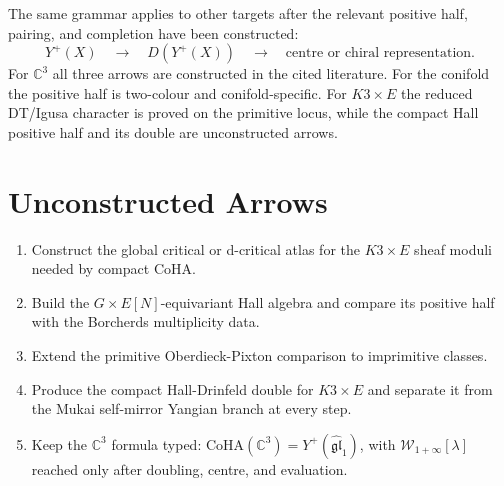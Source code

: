 \documentclass[11pt]{article}
\theoremstyle{definition}
\theoremstyle{remark}
\providecommand{\CoHA}{\mathrm{CoHA}}
\providecommand{\Winf}{\mathcal{W}_{1+\infty}}
\providecommand{\CC}{\mathbb{C}}
\providecommand{\gghone}{\widehat{\mathfrak{gl}}_1}
\begin{document}
The same grammar applies to other targets after the relevant positive
half, pairing, and completion have been constructed:
\[
 Y^+(X)\quad\longrightarrow\quad D(Y^+(X))\quad\longrightarrow\quad
\text{centre or chiral representation}.
\]
For $\CC^3$ all three arrows are constructed in the cited literature.
For the conifold the positive half is two-colour and conifold-specific.
For $K3\times E$ the reduced DT/Igusa character is proved on the
primitive locus, while the compact Hall positive half and its double are
unconstructed arrows.

\section{Unconstructed Arrows}
\label{sec:unconstructed-arrows}

\begin{enumerate}
\item Construct the global critical or d-critical atlas for the
$K3\times E$ sheaf moduli needed by compact CoHA.
\item Build the $G\times E[N]$-equivariant Hall algebra and compare its
positive half with the Borcherds multiplicity data.
\item Extend the primitive Oberdieck-Pixton comparison to imprimitive
classes.
\item Produce the compact Hall-Drinfeld double for $K3\times E$ and
separate it from the Mukai self-mirror Yangian branch at every step.
\item Keep the $\CC^3$ formula typed:
$\CoHA(\CC^3)=Y^+(\gghone)$, with $\Winf[\lambda]$ reached only after
doubling, centre, and evaluation.
\end{enumerate}
\end{document}
